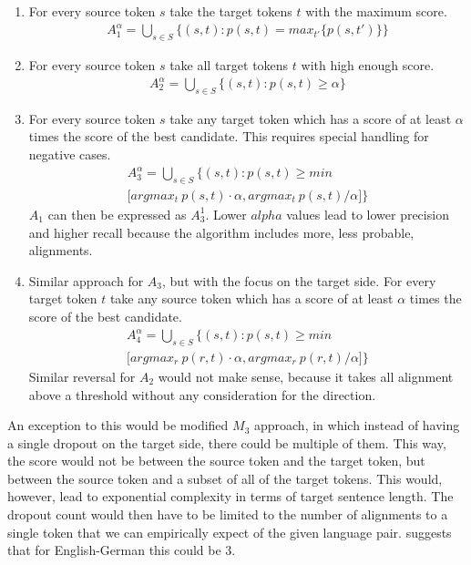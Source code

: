 \begin{enumerate}
    \item For every source token $s$ take the target tokens $t$ with the maximum score.
    \begin{gather*}
        A_1^\alpha = \bigcup_{s \in S} \{ (s, t): p(s,t) = max_{t'} \{p(s,t') \} \}
    \end{gather*}
    
    \item For every source token $s$ take all target tokens $t$ with high enough score.
    \begin{gather*}
        A_2^\alpha = \bigcup_{s \in S} \{(s, t): p(s,t) \ge \alpha \}
    \end{gather*}
    
    \item For every source token $s$ take any target token which has a score of at least $\alpha$ times the score of the best candidate. This requires special handling for negative cases.
    \begin{gather*}
        A_3^\alpha = \bigcup_{s \in S} \{ (s, t): p(s,t) \ge min \\
        \big[ argmax_t\ p(s,t) \cdot \alpha, argmax_t\ p(s,t) / \alpha \big] \}
    \end{gather*}
    $A_1$ can then be expressed as $A_3^1$. Lower $alpha$ values lead to lower precision and higher recall because the algorithm includes more, less probable, alignments.
    
    \item Similar approach for $A_3$, but with the focus on the target side. For every target token $t$ take any source token which has a score of at least $\alpha$ times the score of the best candidate.
    \begin{gather*}
        A_4^\alpha = \bigcup_{s \in S} \{ (s, t): p(s,t) \ge min \\
        \big[ argmax_r\ p(r,t) \cdot \alpha, argmax_r\ p(r,t) / \alpha \big] \}
    \end{gather*}
    Similar reversal for $A_2$ would not make sense, because it takes all alignment above a threshold without any consideration for the direction.
\end{enumerate}

An exception to this would be modified $M_3$ approach, in which instead of having a single dropout on the target side, there could be multiple of them. This way, the score would not be between the source token and the target token, but between the source token and a subset of all of the target tokens. This would, however, lead to exponential complexity in terms of target sentence length. The dropout count would then have to be limited to the number of alignments to a single token that we can empirically expect of the given language pair.  suggests that for English-German this could be 3.

